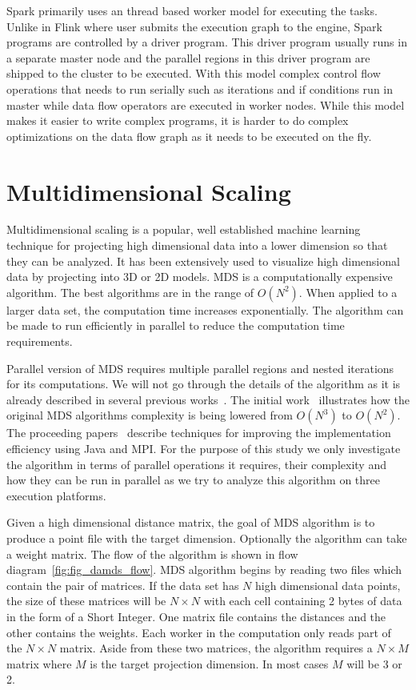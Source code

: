\documentclass[conference]{IEEEtran}
\begin{document}
Spark primarily uses an thread based worker model for executing the tasks. Unlike in Flink where user submits the execution graph to the engine, Spark programs are controlled by a driver program. This driver program usually runs in a separate master node and the parallel regions in this driver program are shipped to the cluster to be executed. With this model complex control flow operations that needs to run serially such as iterations and if conditions run in master while data flow operators are executed in worker nodes. While this model makes it easier to write complex programs, it is harder to do complex optimizations on the data flow graph as it needs to be executed on the fly.

\section{Multidimensional Scaling} \label{mds}

Multidimensional scaling is a popular, well established machine learning technique for projecting high dimensional data into a lower dimension so that they can be analyzed. It has been extensively used to visualize high dimensional data by projecting into 3D or 2D models. MDS is a computationally expensive algorithm. The best algorithms are in the range of $O(N^2)$. When applied to a larger data set, the computation time increases exponentially. The algorithm can be made to run efficiently in parallel to reduce the computation time requirements. 

Parallel version of MDS requires multiple parallel regions and nested iterations for its computations. We will not go through the details of the algorithm as it is already described in several previous works~\cite{DBLP:conf/eScience/RuanF13,hpc2016:spidaljava, ekanayakejava}. The initial work~\cite{DBLP:conf/eScience/RuanF13} illustrates how the original MDS algorithms complexity is being lowered from $O(N^3)$ to $O(N^2)$. The proceeding papers~\cite{hpc2016:spidaljava,ekanayakejava} describe techniques for improving the implementation efficiency using Java and MPI. For the purpose of this study we only investigate the algorithm in terms of parallel operations it requires, their complexity and how they can be run in parallel as we try to analyze this algorithm on three execution platforms.

Given a high dimensional distance matrix, the goal of MDS algorithm is to produce a point file with the target dimension. Optionally the algorithm can take a weight matrix. The flow of the algorithm is shown in flow diagram~\ref{fig:fig_damds_flow}. MDS algorithm begins by reading two files which contain the pair of matrices. If the data set has $N$ high dimensional data points, the size of these matrices will be $N \times N$ with each cell containing 2 bytes of data in the form of a Short Integer. One matrix file contains the distances and the other contains the weights. Each worker in the computation only reads part of the $N \times N$ matrix. Aside from these two matrices, the algorithm requires a $N \times  M$ matrix where $M$ is the target projection dimension. In most cases $M$ will be 3 or 2. 
\end{document}
